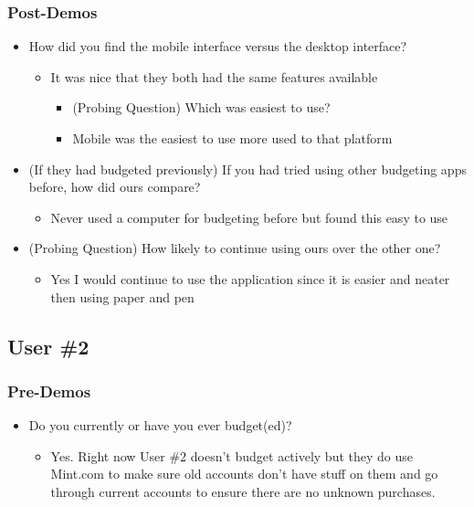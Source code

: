 \documentclass{chi2011}
\begin{document}
\begin{itemize}[noitemsep]
	\subsubsection{Post-Demos}
	\begin{itemize}[noitemsep]
		\item How did you find the mobile interface versus the desktop interface?
		\begin{itemize}[noitemsep]
			\item It was nice that they both had the same features available
			\begin{itemize}[noitemsep]
				\item (Probing Question) Which was easiest to use?
				\item Mobile was the easiest to use more used to that
						platform
			\end{itemize}
		\end{itemize}	
	\item (If they had budgeted previously) If you had tried using other budgeting apps before, how did ours compare?
		\begin{itemize}[noitemsep]
				\item Never used a computer for budgeting before but found this
					easy to use
		\end {itemize}
	\item (Probing Question) How likely to continue using ours over the other one?
		\begin{itemize}[noitemsep]
				\item Yes I would continue to use the application since it is
					easier and neater then using paper and pen
		\end{itemize}
	\end{itemize}


	\subsection{User \#2}

	\subsubsection{Pre-Demos}
	\begin{itemize}[noitemsep]
		\item Do you currently or have you ever budget(ed)?
		\begin{itemize}[noitemsep]
			\item 
				Yes. Right now User \#2 doesn't budget actively but they do use Mint.com to make sure old
				accounts don't have stuff on them and go through current accounts to ensure there are no
				unknown purchases. 
				

\end{itemize}
\end{itemize}
\end{itemize}
\end{document}
